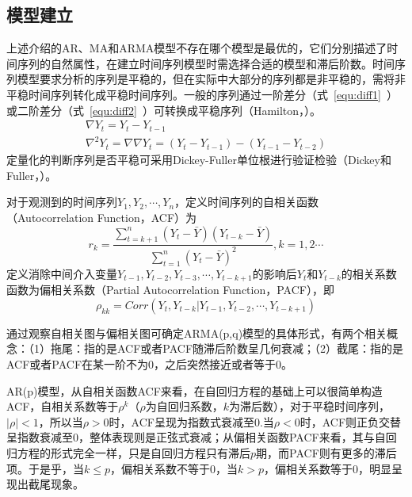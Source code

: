 \subsection{模型建立}
\label{chap:armamodelbuilding}

上述介绍的AR、MA和ARMA模型不存在哪个模型是最优的，它们分别描述了时间序列的自然属性，在建立时间序列模型时需选择合适的模型和滞后阶数。时间序列模型要求分析的序列是平稳的，但在实际中大部分的序列都是非平稳的，需将非平稳时间序列转化成平稳时间序列。一般的序列通过一阶差分（式~\ref{equ:diff1}~）或二阶差分（式~\ref{equ:diff2}~）可转换成平稳序列（Hamilton，\citeyear{hamilton1994time}）。
\begin{gather}
	\label{equ:diff1}
	\nabla {{Y}_{t}}={{Y}_{t}}-{{Y}_{t-1}} \\ 
	\label{equ:diff2}
	{{\nabla }^{2}}{{Y}_{t}}=\nabla \nabla {{Y}_{t}}=({{Y}_{t}}-{{Y}_{t-1}})-({{Y}_{t-1}}-{{Y}_{t-2}}) 
\end{gather}
定量化的判断序列是否平稳可采用Dickey-Fuller单位根进行验证检验（Dickey和Fuller，\citeyear{dickey1979distribution}）。

对于观测到的时间序列${{Y}_{1}},{{Y}_{2}},\cdots ,{{Y}_{n}}$，定义时间序列的自相关函数（Autocorrelation Function，ACF）为
\begin{equation}
	{{r}_{k}}=\frac{\sum\limits_{t=k+1}^{n}{({{Y}_{t}}-\bar{Y})({{Y}_{t-k}}-\bar{Y})}}{\sum\limits_{t=1}^{n}{{{({{Y}_{t}}-\bar{Y})}^{2}}}},k=1,2\cdots 
\end{equation}
定义消除中间介入变量${{Y}_{t-1}},{{Y}_{t-2}},{{Y}_{t-3}},\cdots ,{{Y}_{t-k+1}}$的影响后$Y_t$和$Y_{t-k}$的相关系数函数为偏相关系数（Partial Autocorrelation Function，PACF），即
\begin{equation}
	{{\rho }_{kk}}=Corr({{Y}_{t}},{{Y}_{t-k}}|{{Y}_{t-1}},{{Y}_{t-2}},\cdots ,{{Y}_{t-k+1}})
\end{equation}

通过观察自相关图与偏相关图可确定ARMA(p,q)模型的具体形式，有两个相关概念：（1）拖尾：指的是ACF或者PACF随滞后阶数呈几何衰减；（2）截尾：指的是ACF或者PACF在某一阶不为0，之后突然接近或者等于0。

AR(p)模型，从自相关函数ACF来看，在自回归方程的基础上可以很简单构造ACF，自相关系数等于${{\rho }^{k}}$（${\rho }$为自回归系数，$k$为滞后数），对于平稳时间序列，$\left| \rho  \right|<1$，所以当${\rho }>0$时，ACF呈现为指数式衰减至0.当${\rho }<0$时，ACF则正负交替呈指数衰减至0，整体表现则是正弦式衰减；从偏相关函数PACF来看，其与自回归方程的形式完全一样，只是自回归方程只有滞后$p$期，而PACF则有更多的滞后项。于是乎，当$k\le p$，偏相关系数不等于0，当$k>p$，偏相关系数等于0，明显呈现出截尾现象。

